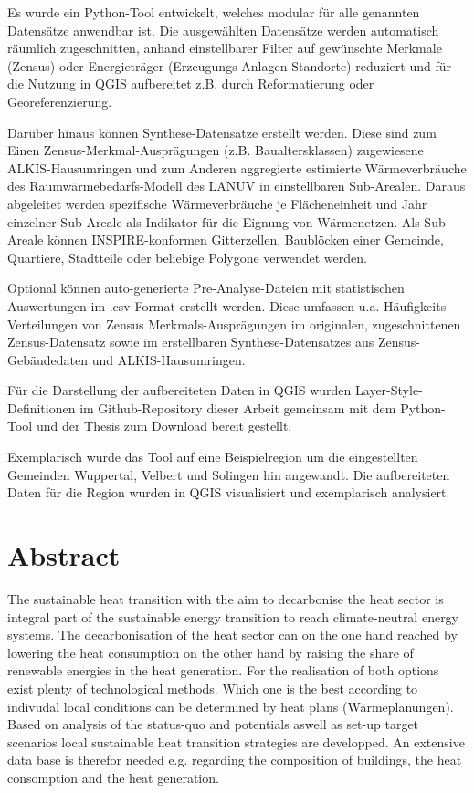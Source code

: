 	Es wurde ein Python-Tool entwickelt, welches modular für alle genannten Datensätze anwendbar ist. Die ausgewählten Datensätze werden automatisch räumlich zugeschnitten, anhand einstellbarer Filter auf gewünschte Merkmale (Zensus) oder Energieträger (Erzeugungs-Anlagen Standorte) reduziert und für die Nutzung in QGIS aufbereitet z.B. durch Reformatierung oder Georeferenzierung.
	
	Darüber hinaus können Synthese-Datensätze erstellt werden. Diese sind zum Einen Zensus-Merkmal-Ausprägungen (z.B. Baualtersklassen) zugewiesene ALKIS-Hausumringen und zum Anderen aggregierte estimierte Wärmeverbräuche des Raumwärmebedarfs-Modell des LANUV in einstellbaren Sub-Arealen. Daraus abgeleitet werden spezifische Wärmeverbräuche je Flächeneinheit und Jahr einzelner Sub-Areale als Indikator für die Eignung von Wärmenetzen. Als Sub-Areale können INSPIRE-konformen Gitterzellen, Baublöcken einer Gemeinde, Quartiere, Stadtteile oder beliebige Polygone verwendet werden.
	
	Optional können auto-generierte Pre-Analyse-Dateien mit statistischen Auswertungen im .csv-Format erstellt werden. Diese umfassen u.a. Häufigkeits-Verteilungen von Zensus Merkmals-Ausprägungen im originalen, zugeschnittenen Zensus-Datensatz sowie im erstellbaren Synthese-Datensatzes aus Zensus-Gebäudedaten und ALKIS-Hausumringen. 
	
	Für die Darstellung der aufbereiteten Daten in QGIS wurden Layer-Style-Definitionen im Github-Repository dieser Arbeit gemeinsam mit dem Python-Tool und der Thesis zum Download bereit gestellt. 
	
	Exemplarisch wurde das Tool auf eine Beispielregion um die eingestellten Gemeinden Wuppertal, Velbert und Solingen hin angewandt. Die aufbereiteten Daten für die Region wurden in QGIS visualisiert und exemplarisch analysiert. 
	
\endgroup

\begingroup
	\section*{Abstract}
	The sustainable heat transition with the aim to decarbonise the heat sector is integral part of the sustainable energy transition to reach climate-neutral energy systems. The decarbonisation of the heat sector can on the one hand reached by lowering the heat consumption on the other hand by raising the share of renewable energies in the heat generation. For the realisation of both options exist plenty of technological methods. Which one is the best according to indivudal local conditions can be determined by heat plans (Wärmeplanungen). Based on analysis of the status-quo and potentials aswell as set-up target scenarios local sustainable heat transition strategies are developped. An extensive data base is therefor needed e.g. regarding the composition of buildings, the heat consomption and the heat generation.
	
